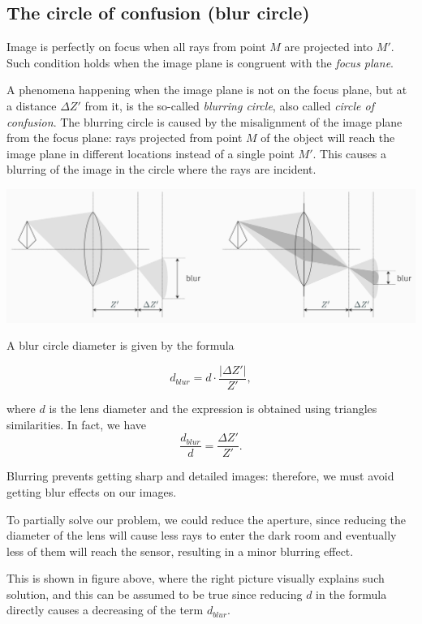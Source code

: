 \documentclass[10pt]{report}
\begin{document}
\subsection{The circle of confusion (blur circle)}
\label{the-circle-of-confusion-blur-circle}
Image is perfectly on focus when all rays from point \(M\) are projected
into \(M'\). Such condition holds when the image plane is congruent with
the \emph{focus plane}.

A phenomena happening when the image plane is not on the focus plane,
but at a distance \(\Delta Z'\) from it, is the so-called \emph{blurring
circle}, also called \emph{circle of confusion}. The blurring circle is
caused by the misalignment of the image plane from the focus plane: rays
projected from point \(M\) of the object will reach the image plane in
different locations instead of a single point \(M'\). This causes a
blurring of the image in the circle where the rays are incident.

\begin{center}
\includegraphics[width=.9\linewidth]{./pics/visio/blur-circles.jpg}
\end{center}

A blur circle diameter is given by the formula

\[d_{blur} = d\cdot\frac{|\Delta Z'|}{Z'},\]

where \(d\) is the lens diameter and the expression is obtained using
triangles similarities. In fact, we have
\[ \frac{d_{blur}}{d} = \frac{\Delta Z'}{Z'}.\]

Blurring prevents getting sharp and detailed images: therefore, we must
avoid getting blur effects on our images.

To partially solve our problem, we could reduce the aperture, since
reducing the diameter of the lens will cause less rays to enter the dark
room and eventually less of them will reach the sensor, resulting in a
minor blurring effect.

This is shown in figure above, where the right picture visually explains
such solution, and this can be assumed to be true since reducing \(d\)
in the formula directly causes a decreasing of the term \(d_{blur}\).
\end{document}
